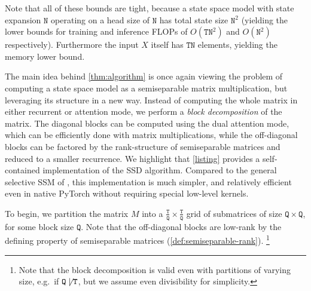 Note that all of these bounds are tight, because a state space model with state expansion $\mathtt{N}$ operating on a head size of $\mathtt{N}$ has total state size $\mathtt{N}^2$ (yielding the lower bounds for training and inference FLOPs of $O(\mathtt{TN}^2)$ and $O(\mathtt{N}^2)$ respectively). Furthermore the input $X$ itself has $\mathtt{TN}$ elements, yielding the memory lower bound.

The main idea behind \ref{thm:algorithm} is once again viewing the problem of computing a state space model as a semiseparable matrix multiplication, but leveraging its structure in a new way. Instead of computing the whole matrix in either recurrent or attention mode, we perform a \emph{block decomposition} of the matrix. The diagonal blocks can be computed using the dual attention mode, which can be efficiently done with matrix multiplications, while the off-diagonal blocks can be factored by the rank-structure of semiseparable matrices and reduced to a smaller recurrence. We highlight that \ref{listing} provides a self-contained implementation of the SSD algorithm. Compared to the general selective SSM of \citep{gu2023mamba},
this implementation is much simpler, and relatively efficient even in native PyTorch without requiring special low-level kernels.

To begin, we partition the matrix $M$ into a $\frac{\mathtt{T}}{\mathtt{Q}} \times \frac{\mathtt{T}}{\mathtt{Q}}$ grid of submatrices of size $\mathtt{Q} \times \mathtt{Q}$,
for some block size $\mathtt{Q}$.
Note that the off-diagonal blocks are low-rank by the defining property of semiseparable matrices (\ref{def:semiseparable-rank}).
\footnote{Note that the block decomposition is valid even with partitions of varying size, e.g.\ if $\mathtt{Q} \not\mid \mathtt{T}$, but we assume even divisibility for simplicity.}

